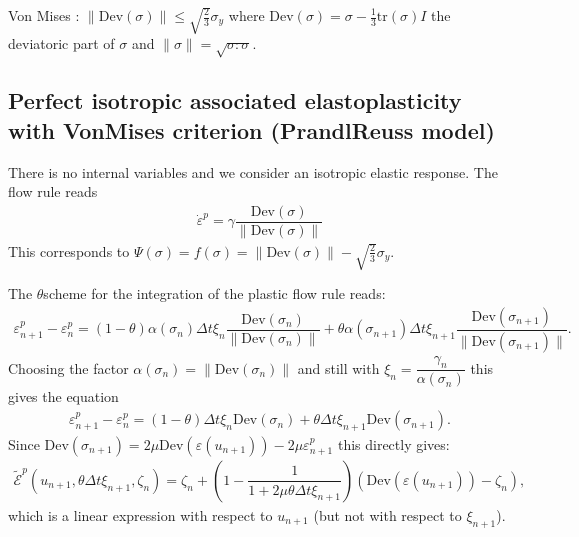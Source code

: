 \documentclass[a4paper,11pt,english]{sphinxmanual}
\begin{document}
Von Mises :  \(\|\mbox{Dev}(\sigma)\| \le \sqrt{\frac{2}{3}}\sigma_y\) where
\(\mbox{Dev}(\sigma) = \sigma - \frac{1}{3}\mbox{tr}(\sigma)I\) the deviatoric part of \(\sigma\) and \(\|\sigma\| = \sqrt{\sigma:\sigma}\).


\subsection{Perfect isotropic associated elastoplasticity with Von\sphinxhyphen{}Mises criterion (Prandl\sphinxhyphen{}Reuss model)}
\label{\detokenize{userdoc/model_plasticity_small_strain:perfect-isotropic-associated-elastoplasticity-with-von-mises-criterion-prandl-reuss-model}}
There is no internal variables and we consider an isotropic elastic response. The flow rule reads
\begin{equation*}
\begin{split}\dot{\varepsilon}^p = \gamma \dfrac{\mbox{Dev}(\sigma)}{\|\mbox{Dev}(\sigma)\|}\end{split}
\end{equation*}
This corresponds to \(\Psi(\sigma) = f(\sigma) = \|\mbox{Dev}(\sigma)\| - \sqrt{\frac{2}{3}}\sigma_y\).

The \(\theta\)\sphinxhyphen{}scheme for the integration of the plastic flow rule reads:
\begin{equation*}
\begin{split}\varepsilon^p_{n+1} - \varepsilon^p_{n} = (1-\theta)\alpha(\sigma_{n}) \Delta t \xi_n \dfrac{\mbox{Dev}(\sigma_{n})}{\|\mbox{Dev}(\sigma_{n})\|} + \theta\alpha(\sigma_{n+1}) \Delta t \xi_{n+1} \dfrac{\mbox{Dev}(\sigma_{n+1})}{\|\mbox{Dev}(\sigma_{n+1})\|}.\end{split}
\end{equation*}
Choosing the factor \(\alpha(\sigma_{n}) = \|\mbox{Dev}(\sigma_{n})\|\) and still with \(\xi_n = \dfrac{\gamma_n}{\alpha(\sigma_{n})}\) this gives the equation
\begin{equation*}
\begin{split}\varepsilon^p_{n+1} - \varepsilon^p_{n} = (1-\theta)\Delta t \xi_n \mbox{Dev}(\sigma_{n}) + \theta \Delta t \xi_{n+1} \mbox{Dev}(\sigma_{n+1}).\end{split}
\end{equation*}
Since \(\mbox{Dev}(\sigma_{n+1}) = 2\mu\mbox{Dev}(\varepsilon(u_{n+1})) - 2\mu\varepsilon^p_{n+1}\) this directly gives:
\begin{equation*}
\begin{split}\tilde{\mathscr E}^p(u_{n+1}, \theta \Delta t \xi_{n+1}, \zeta_{n}) = \zeta_n + \left(1-\dfrac{1}{1+2\mu\theta\Delta t\xi_{n+1}}\right)(\mbox{Dev}(\varepsilon(u_{n+1})) - \zeta_n),\end{split}
\end{equation*}
which is a linear expression with respect to \(u_{n+1}\) (but not with respect to \(\xi_{n+1}\)).
\end{document}
